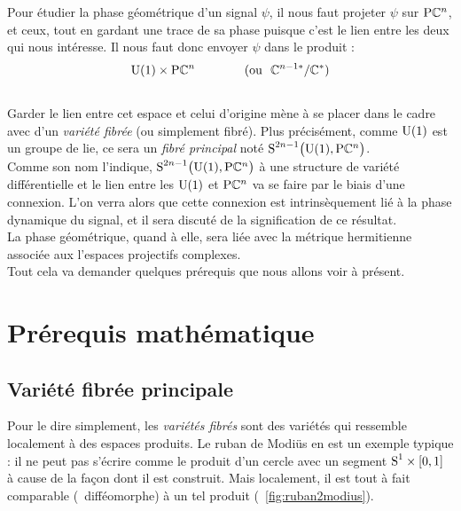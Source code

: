 \newpage


 Pour étudier la phase géométrique d'un signal $\psi$, il nous faut projeter $\psi$ sur $\PC{n}$, et ceux, tout en gardant une trace de sa phase puisque c'est le lien entre les deux qui nous intéresse. Il nous faut donc envoyer $\psi$ dans le produit :
\[\U{1}\times \PC{n}\qquad\qquad (\text{ou }\ \C^{n-1*}/\C^*)\]
\\
Garder le lien entre cet espace et celui d'origine mène à se placer dans le cadre avec d'un \emph{variété fibrée} (ou simplement fibré). Plus précisément, comme $\U{1}$ est un groupe de lie, ce sera un \emph{fibré principal} noté $\S{2n-1}\big(\U{1},\PC{n}\big)$.
\\

Comme son nom l'indique, $\S{2n-1}\big(\U{1},\PC{n}\big)$ à une structure de variété différentielle et le lien entre les $\U{1}$ et $\PC{n}$ va se faire par le biais d'une connexion. L'on verra alors que cette connexion est intrinsèquement lié à la phase dynamique du signal, et il sera discuté de la signification de ce résultat.
\\
La phase géométrique, quand à elle, sera liée avec la métrique hermitienne associée aux l'espaces projectifs complexes.
\\
Tout cela va demander quelques prérequis que nous allons voir à présent.
\\



\section{Prérequis mathématique}

\subsection{Variété fibrée principale}

Pour le dire simplement, les \emph{variétés fibrés} sont des variétés qui ressemble localement à des espaces produits. 
Le ruban de Modiüs en est un exemple typique : il ne peut pas s'écrire comme le produit d'un cercle avec un segment $\S{1}\times [0,1]$ à cause de la façon dont il est construit. Mais localement, il est tout à fait comparable (\ie~difféomorphe) à un tel produit (\cf~\cref{fig:ruban2modius}).
\\

